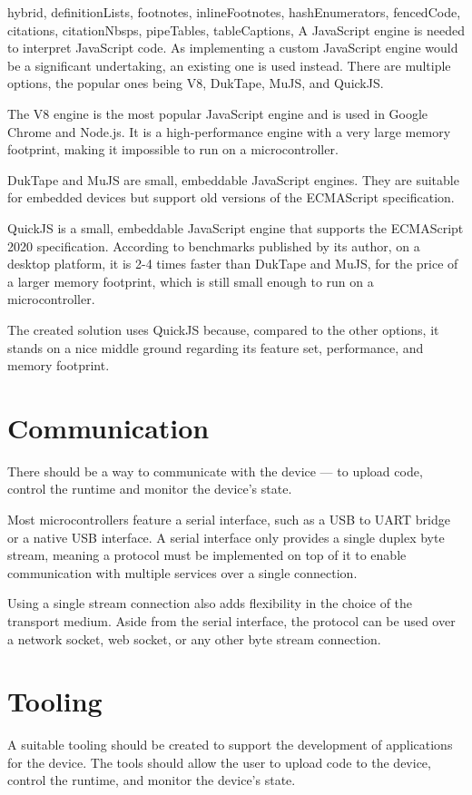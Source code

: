 \begin{markdown*}{%
  hybrid,
  definitionLists,
  footnotes,
  inlineFootnotes,
  hashEnumerators,
  fencedCode,
  citations,
  citationNbsps,
  pipeTables,
  tableCaptions,
}
A JavaScript engine is needed to interpret JavaScript code. As implementing a custom JavaScript engine would be a significant undertaking, an existing one is used instead. There are multiple options, the popular ones being V8, DukTape, MuJS, and QuickJS.

The V8 engine is the most popular JavaScript engine and is used in Google Chrome and Node.js. It is a high-performance engine with a very large memory footprint, making it impossible to run on a microcontroller.

DukTape and MuJS are small, embeddable JavaScript engines. They are suitable for embedded devices but support old versions of the ECMAScript specification.

QuickJS is a small, embeddable JavaScript engine that supports the ECMAScript 2020 specification. According to benchmarks published by its author\cite{quickjs-bench}, on a desktop platform, it is 2-4 times faster than DukTape and MuJS, for the price of a larger memory footprint, which is still small enough to run on a microcontroller.

The created solution uses QuickJS because, compared to the other options, it stands on a nice middle ground regarding its feature set, performance, and memory footprint.

\section{Communication}

There should be a way to communicate with the device --- to upload code, control the runtime and monitor the device's state.

Most microcontrollers feature a serial interface, such as a USB to UART bridge or a native USB interface. A serial interface only provides a single duplex byte stream, meaning a protocol must be implemented on top of it to enable communication with multiple services over a single connection.

Using a single stream connection also adds flexibility in the choice of the transport medium. Aside from the serial interface, the protocol can be used over a network socket, web socket, or any other byte stream connection.

\section{Tooling}

A suitable tooling should be created to support the development of applications for the device. The tools should allow the user to upload code to the device, control the runtime, and monitor the device's state.


\end{markdown*}
